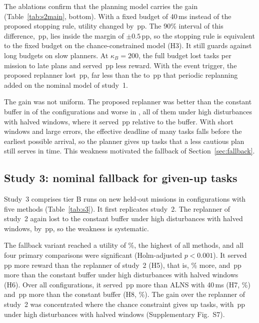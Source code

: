 
The ablations confirm that the planning model carries the gain (Table~\ref{tab:s2main}, bottom). With a fixed budget
of 40\,ms instead of the proposed stopping rule, utility changed by \,pp. The 90\% interval of this
difference, \,pp, lies inside the margin of $\pm0.5$\,pp, so the stopping rule is equivalent to the fixed
budget on the chance-constrained model (H3). It still guards against long budgets on slow planners. At $\kappa_B=200$,
the full budget lost  tasks per mission to late plans and served \,pp less
reward. With the event trigger, the proposed replanner lost \,pp, far less than the  to
\,pp that periodic replanning added on the nominal model of study~1.

The gain was not uniform. The proposed replanner was better than the constant buffer in  of the
 configurations and worse in , all of them under high disturbances with halved windows,
where it served \,pp relative to the buffer. With short windows and large errors, the effective
deadline of many tasks falls before the earliest possible arrival, so the planner gives up tasks that a less cautious
plan still serves in time. This weakness motivated the fallback of Section~\ref{sec:fallback}.

\subsection{Study 3: nominal fallback for given-up tasks}\label{sec:study3}
Study~3 comprises  tier B runs on  new held-out missions in  configurations
with five methods (Table~\ref{tab:s3}). It first replicates study~2. The replanner of study~2 again lost to the
constant buffer under high disturbances with halved windows, by \,pp, so the weakness is
systematic.

The fallback variant reached a utility of \%, the highest of all methods, and all four primary comparisons
were significant (Holm-adjusted $p<0.001$). It served \,pp more reward than the replanner of study~2
(H5), that is, \% more, and \,pp more than the constant buffer under high
disturbances with halved windows (H6). Over all configurations, it served \,pp more than ALNS with
40\,ms (H7, \%) and \,pp more than the constant buffer (H8, \%). The gain over
the replanner of study~2 was concentrated where the chance constraint gives up tasks, with \,pp
under high disturbances with halved windows (Supplementary Fig.~S7).


